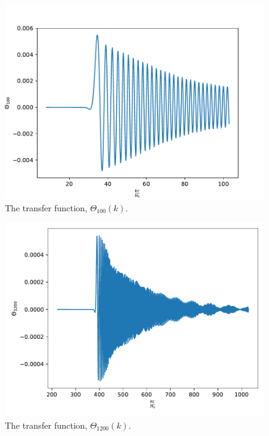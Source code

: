 \documentclass{aa}
\begin{document}
\begin{figure}[h!]
   \includegraphics[scale=0.6]{../figures/milestone4/theta_100.pdf}
   \caption{The transfer function, $\Theta_{100}(k)$.}\label{fig:m4_theta100}
\end{figure}

\begin{figure}[h!]
   \includegraphics[scale=0.6]{../figures/milestone4/theta_1200.pdf}
   \caption{The transfer function, $\Theta_{1200}(k)$.}\label{fig:m4_theta1200}
\end{figure}
\end{document}
